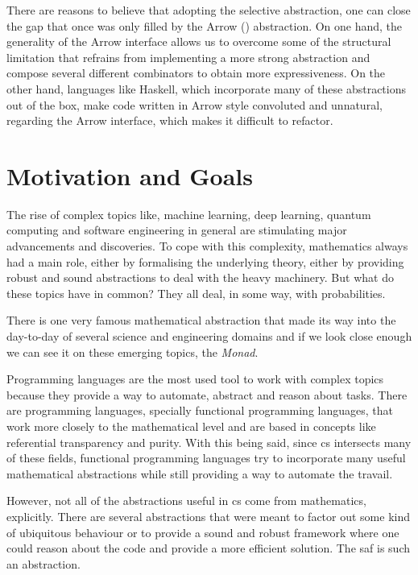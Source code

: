 \documentclass[
  oneside,
  11pt, a4paper,
  footinclude=true,
  headinclude=true,
  cleardoublepage=empty
]{scrbook}
\theoremstyle{definition}
\theoremstyle{definition}
\begin{document}
    There are reasons to believe that adopting the selective abstraction, one can close the gap that once was only filled by the Arrow (\cite{Hughes:2000:GMA:347238.347246}) abstraction. On one hand, the generality of the Arrow interface allows us to overcome some of the structural limitation that refrains from implementing a more strong abstraction and compose several different combinators to obtain more expressiveness. On the other hand, languages like Haskell, which incorporate many of these abstractions out of the box, make code written in Arrow style convoluted and unnatural, regarding the Arrow interface, which makes it difficult to refactor.
    
    \section{Motivation and Goals}\label{sec-moti-goals}
    
	    The rise of complex topics like, machine learning, deep learning, quantum computing and software engineering in general are stimulating major advancements and discoveries. To cope with this complexity, mathematics always had a main role, either by formalising the underlying theory, either by providing robust and sound abstractions to deal with the heavy machinery. But what do these topics have in common? They all deal, in some way, with probabilities. 
	    
	    There is one very famous mathematical abstraction that made its way into the day-to-day of several science and engineering domains and if we look close enough we can see it on these emerging topics, the \emph{Monad}.
	    
	    Programming languages are the most used tool to work with complex topics because they provide a way to automate, abstract and reason about tasks. There are programming languages, specially functional programming languages, that work more closely to the mathematical level and are based in concepts like referential transparency and purity. With this being said, since \gls{cs} intersects many of these fields, functional programming languages try to incorporate many useful mathematical abstractions while still providing a way to automate the travail.
	    
	    However, not all of the abstractions useful in \gls{cs} come from mathematics, explicitly. There are several abstractions that were meant to factor out some kind of ubiquitous behaviour or to provide a sound and robust framework where one could reason about the code and provide a more efficient solution. The \gls{saf} is such an abstraction.
	    
\end{document}
